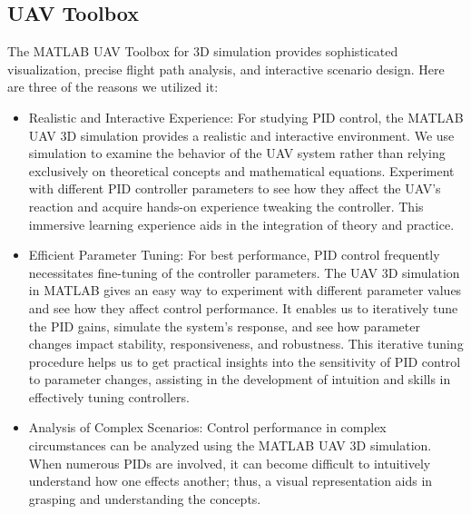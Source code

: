\subsection{UAV Toolbox}
The MATLAB UAV Toolbox for 3D simulation provides sophisticated visualization, precise flight path analysis, and interactive scenario design. Here are three of the reasons we utilized it:
\begin{itemize}
    \item
    Realistic and Interactive Experience: For studying PID control, the MATLAB UAV 3D simulation provides a realistic and interactive environment. We use simulation to examine the behavior of the UAV system rather than relying exclusively on theoretical concepts and mathematical equations. Experiment with different PID controller parameters to see how they affect the UAV's reaction and acquire hands-on experience tweaking the controller. This immersive learning experience aids in the integration of theory and practice.
    \item
    Efficient Parameter Tuning: For best performance, PID control frequently necessitates fine-tuning of the controller parameters. The UAV 3D simulation in MATLAB gives an easy way to experiment with different parameter values and see how they affect control performance. It enables us to iteratively tune the PID gains, simulate the system's response, and see how parameter changes impact stability, responsiveness, and robustness. This iterative tuning procedure helps us to get practical insights into the sensitivity of PID control to parameter changes, assisting in the development of intuition and skills in effectively tuning controllers.
    \item
    Analysis of Complex Scenarios: Control performance in complex circumstances can be analyzed using the MATLAB UAV 3D simulation. When numerous PIDs are involved, it can become difficult to intuitively understand how one effects another; thus, a visual representation aids in grasping and understanding the concepts.
\end{itemize}